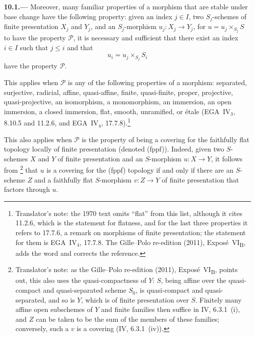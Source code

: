 \medskip
{}\label{par:sga3-VIB-10.1}%
\noindent\textbf{10.1.---}
Moreover, many familiar properties of a morphism that are
stable under base change have the following property: given an
index \(j\in I\), two \(S_j\)-schemes of finite presentation
\(X_j\) and \(Y_j\), and an \(S_j\)-morphism \(u_j:X_j\to Y_j\),
for \(u=u_j\times_{S_j}S\) to have the property \(\mathcal P\),
it is necessary and sufficient that there exist an index
\(i\in I\) such that \(j\leq i\) and that
\[
  u_i=u_j\times_{S_j}S_i
\]
have the property \(\mathcal P\).

This applies when \(\mathcal P\) is any of the following
properties of a morphism: separated, surjective, radicial,
affine, quasi-affine, finite, quasi-finite, proper,
projective, quasi-projective, an isomorphism, a monomorphism,
an immersion, an open immersion, a closed immersion, flat,
smooth, unramified, or \'etale \textup{(EGA~IV\(_3\), 8.10.5
and 11.2.6, and EGA~IV\(_4\), 17.7.8)}.\footnote{Translator's note: the 1970 text omits ``flat''
from this list, although it cites 11.2.6, which is the statement for flatness, and for the last three
properties it refers to 17.7.6, a remark on morphisms of finite presentation; the statement for them is
EGA~IV\(_4\), 17.7.8. The Gille--Polo re-edition (2011), Expos\'e~VI\textsubscript{B}, adds the word and
corrects the reference.}

This also applies when \(\mathcal P\) is the property of being
a covering for the faithfully flat topology locally of finite
presentation \textup{(denoted (fppf))}. Indeed, given
two \(S\)-schemes \(X\) and \(Y\) of finite presentation and
an \(S\)-morphism \(u:X\to Y\), it follows from
\hyperref[sga3:iv:proposition:6:3:1:item:i:01]%
  {}\footnote{Translator's
note: as the Gille--Polo re-edition (2011), Expos\'e~VI\textsubscript{B}, points out, this also uses the
quasi-compactness of \(Y\): \(S\), being affine over the quasi-compact and quasi-separated scheme \(S_0\), is
quasi-compact and quasi-separated, and so is \(Y\), which is of finite presentation over \(S\). Finitely many
affine open subschemes of \(Y\) and finite families then suffice in IV, 6.3.1~\textup{(i)}, and \(Z\) can be
taken to be the sum of the members of these families; conversely, such a \(v\) is a covering (IV,
6.3.1~\textup{(iv)}).}
that \(u\) is a covering for the \textup{(fppf)} topology if
and only if there are an \(S\)-scheme \(Z\) and a faithfully
flat \(S\)-morphism \(v:Z\to Y\) of finite presentation that
factors through \(u\).

